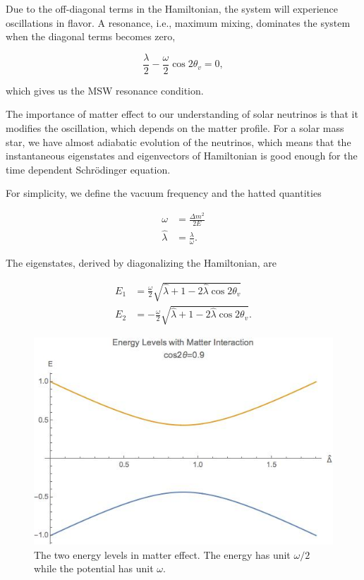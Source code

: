 Due to the off-diagonal terms in the Hamiltonian, the system will experience oscillations in flavor. A resonance, i.e., maximum mixing, dominates the system when the diagonal terms becomes zero,

\begin{equation}
\frac{\lambda}{2} -\frac{ \omega }{2} \cos 2\theta_v  = 0,
\end{equation}

which gives us the MSW resonance condition.

The importance of matter effect to our understanding of solar neutrinos is that it modifies the oscillation, which depends on the matter profile. For a solar mass star, we have almost adiabatic evolution of the neutrinos, which means that the instantaneous eigenstates and eigenvectors of Hamiltonian is good enough for the time dependent Schr\"{o}dinger equation. 


For simplicity, we define the vacuum frequency and the hatted quantities

\begin{align}
\omega &= \frac{\Delta m^2}{2E} \\
\hat\lambda & = \frac{\lambda}{\omega}.
\end{align}

The eigenstates, derived by diagonalizing the Hamiltonian, are

\begin{align}
E_1 &= \frac{\omega}{2}\sqrt{ \hat\lambda +1 -  2\hat\lambda \cos 2\theta_v }\\
E_2 &= -\frac{\omega}{2}\sqrt{ \hat\lambda +1 -  2\hat\lambda \cos 2\theta_v }.
\end{align}


\begin{figure}
\centering
\includegraphics[width=\columnwidth]{chapters/assets/solar/mswEnergyLevels.jpg}
\caption{The two energy levels in matter effect. The energy has unit $\omega/2$ while the potential has unit $\omega$.}
\label{fig:mswEnergyLevels}
\end{figure}

